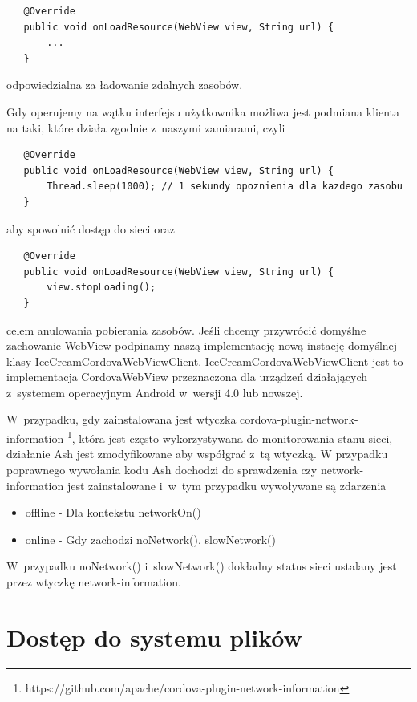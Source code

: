 \documentclass[brudnopis]{xmgr}
\begin{document}
\begin{lstlisting}
   @Override
   public void onLoadResource(WebView view, String url) {
       ...
   }
\end{lstlisting}

odpowiedzialna za ładowanie zdalnych zasobów.

Gdy operujemy na wątku interfejsu użytkownika możliwa jest podmiana klienta na taki, które działa zgodnie z~naszymi zamiarami, czyli 

\begin{lstlisting}
   @Override
   public void onLoadResource(WebView view, String url) {
       Thread.sleep(1000); // 1 sekundy opoznienia dla kazdego zasobu
   }
\end{lstlisting}

aby spowolnić dostęp do sieci oraz

\begin{lstlisting}
   @Override
   public void onLoadResource(WebView view, String url) {
       view.stopLoading();
   }
\end{lstlisting}

celem anulowania pobierania zasobów. Jeśli chcemy przywrócić domyślne zachowanie WebView podpinamy naszą implementację nową instację domyślnej klasy IceCreamCordovaWebViewClient. IceCreamCordovaWebViewClient jest to implementacja CordovaWebView przeznaczona dla urządzeń działających z~systemem operacyjnym Android w~wersji 4.0 lub nowszej.

W~przypadku, gdy zainstalowana jest wtyczka cordova-plugin-network-information \footnote{https://github.com/apache/cordova-plugin-network-information}, która jest często wykorzystywana do monitorowania stanu sieci, działanie Ash jest zmodyfikowane aby współgrać z~tą wtyczką. W przypadku poprawnego wywołania kodu Ash dochodzi do sprawdzenia czy network-information jest zainstalowane i~w~tym przypadku wywoływane są zdarzenia

\begin{itemize}
  \item offline - Dla kontekstu networkOn() 
  \item online - Gdy zachodzi noNetwork(), slowNetwork()
\end{itemize}

W~przypadku noNetwork() i~slowNetwork() dokładny status sieci ustalany jest przez wtyczkę network-information.

\section{Dostęp do systemu plików}
\end{document}
